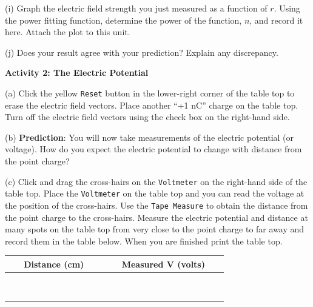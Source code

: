 (i) Graph the electric field strength you just measured as a function of $r$. 
Using the power fitting function, determine the power of the function, $n$, and record it here.
Attach the plot to this unit.
\vspace{12mm}

(j) Does your result agree with your prediction? Explain any discrepancy.
\vspace{12mm}

\vspace{0.5in}
\textbf{Activity 2: The Electric Potential}

(a) Click the yellow {\tt Reset} button in the lower-right corner of the table top
to erase the electric field vectors. Place another ``+1 nC'' charge on the table top.
Turn off the electric field vectors using the check box on the right-hand side.

(b) \textbf{Prediction}: You will now take measurements of the electric potential (or voltage).
How do you expect the electric potential to change with distance from the point
charge?
\vspace{15mm}
 
(c) Click and drag the cross-hairs on the {\tt Voltmeter} on the right-hand side of the table top.
Place the {\tt Voltmeter} on the table top and you can read the voltage
at the position of the cross-hairs.
Use the {\tt Tape Measure} to obtain the distance from the point charge to the cross-hairs.
Measure the electric potential and distance at many spots on the table top from very close to the point charge to
far away and record them in the table below.
When you are finished print the table top.
\vspace{5mm}

\vspace{0.3cm}
{\centering \begin{tabular}{|c|c|}
\hline 
~~~Distance (cm)~~~&
~~~Measured V (volts)~~~\\
\hline
\hline 
&
\\
\hline 
&
\\
\hline 
&
\\
\hline 
&
\\
\hline 
&
\\
\hline 
&
\\
\hline 
&
\\
\hline 
&
\\
\hline 
&
\\
\hline
\end{tabular}\par}
\vspace{0.3cm}


